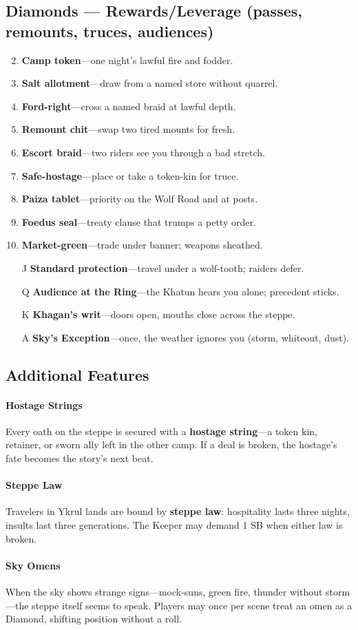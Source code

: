 \subsection*{Diamonds --- Rewards/Leverage (passes, remounts, truces, audiences)}
\begin{enumerate}
\setcounter{enumi}{1}
\item \textbf{Camp token}---one night's lawful fire and fodder.
\item \textbf{Salt allotment}---draw from a named store without quarrel.
\item \textbf{Ford-right}---cross a named braid at lawful depth.
\item \textbf{Remount chit}---swap two tired mounts for fresh.
\item \textbf{Escort braid}---two riders see you through a bad stretch.
\item \textbf{Safe-hostage}---place or take a token-kin for truce.
\item \textbf{Paiza tablet}---priority on the Wolf Road and at posts.
\item \textbf{Foedus seal}---treaty clause that trumps a petty order.
\item \textbf{Market-green}---trade under banner; weapons sheathed.
\item[J] \textbf{Standard protection}---travel under a wolf-tooth; raiders defer.
\item[Q] \textbf{Audience at the Ring}---the Khatun hears you alone; precedent sticks.
\item[K] \textbf{Khagan's writ}---doors open, mouths close across the steppe.
\item[A] \textbf{Sky's Exception}---once, the weather ignores you (storm, whiteout, dust).
\end{enumerate}

\subsection*{Additional Features}
\label{sec:ykrul-features}

\paragraph{Hostage Strings}
Every oath on the steppe is secured with a \textbf{hostage string}---a token kin, retainer, or sworn ally left in the other camp. If a deal is broken, the hostage’s fate becomes the story’s next beat.

\paragraph{Steppe Law}
Travelers in Ykrul lands are bound by \textbf{steppe law}: hospitality lasts three nights, insults last three generations. The Keeper may demand 1 SB when either law is broken.

\paragraph{Sky Omens}
When the sky shows strange signs---mock-suns, green fire, thunder without storm---the steppe itself seems to speak. Players may once per scene treat an omen as a Diamond, shifting position without a roll.
